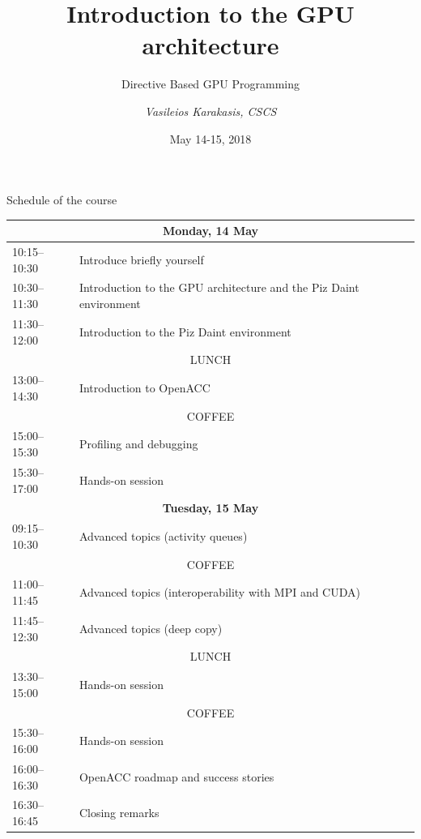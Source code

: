\documentclass[aspectratio=169,12pt]{beamer}
\author{\emph{Vasileios Karakasis, CSCS}}
\title{Introduction to the GPU architecture}
\subtitle{Directive Based GPU Programming}
\date{May 14-15, 2018}
\begin{document}
\cscstitle

\begin{frame}{Schedule of the course}
  \tiny
  \renewcommand\arraystretch{1.2}
  \begin{table}
    \centering
    \begin{tabular}{ll}
      \multicolumn{2}{c}{\bfseries Monday, 14 May} \\\hline
      10:15--10:30 & Introduce briefly yourself \\
      10:30--11:30 & Introduction to the GPU architecture and the Piz Daint environment \\
      11:30--12:00 & Introduction to the Piz Daint environment \\\hline
      \multicolumn{2}{c}{\tiny LUNCH} \\\hline
      13:00--14:30 & Introduction to OpenACC \\\hline
      \multicolumn{2}{c}{\tiny COFFEE} \\\hline
      15:00--15:30 & Profiling and debugging \\
      15:30--17:00 & Hands-on session \\\hline
      \multicolumn{2}{c}{\bfseries Tuesday, 15 May} \\\hline
      09:15--10:30 & Advanced topics (activity queues) \\\hline
      \multicolumn{2}{c}{\tiny COFFEE} \\\hline
      11:00--11:45 & Advanced topics (interoperability with MPI and CUDA) \\
      11:45--12:30 & Advanced topics (deep copy) \\\hline
      \multicolumn{2}{c}{\tiny LUNCH} \\\hline
      13:30--15:00 & Hands-on session \\\hline
      \multicolumn{2}{c}{\tiny COFFEE} \\\hline
      15:30--16:00 & Hands-on session \\
      16:00--16:30 & OpenACC roadmap and success stories \\
      16:30--16:45 & Closing remarks \\
    \end{tabular}
  \end{table}
\end{frame}
\end{document}
